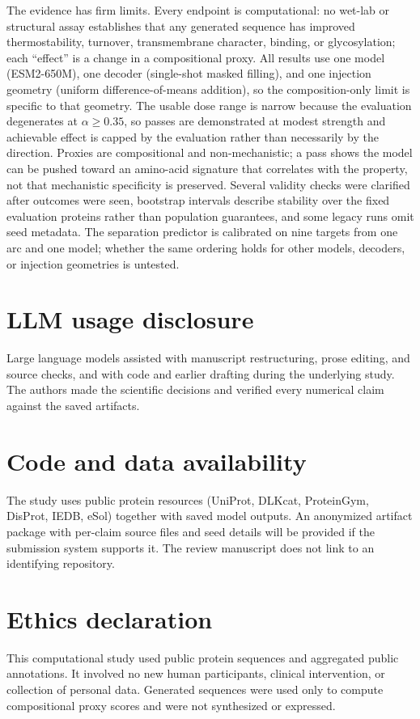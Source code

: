\documentclass{article}
\begin{document}
The evidence has firm limits. Every endpoint is computational: no wet-lab or
structural assay establishes that any generated sequence has improved
thermostability, turnover, transmembrane character, binding, or glycosylation;
each ``effect'' is a change in a compositional proxy. All results use one model
(ESM2-650M), one decoder (single-shot masked filling), and one injection
geometry (uniform difference-of-means addition), so the composition-only limit
is specific to that geometry. The usable dose range is narrow because the
evaluation degenerates at $\alpha\!\ge\!0.35$, so passes are demonstrated at
modest strength and achievable effect is capped by the evaluation rather than
necessarily by the direction. Proxies are compositional and non-mechanistic; a
pass shows the model can be pushed toward an amino-acid signature that
correlates with the property, not that mechanistic specificity is preserved.
Several validity checks were clarified after outcomes were seen, bootstrap
intervals describe stability over the fixed evaluation proteins rather than
population guarantees, and some legacy runs omit seed metadata. The separation
predictor is calibrated on nine targets from one arc and one model; whether the
same ordering holds for other models, decoders, or injection geometries is
untested.

\section*{LLM usage disclosure}
Large language models assisted with manuscript restructuring, prose editing, and
source checks, and with code and earlier drafting during the underlying study.
The authors made the scientific decisions and verified every numerical claim
against the saved artifacts.

\section*{Code and data availability}
The study uses public protein resources (UniProt, DLKcat, ProteinGym, DisProt,
IEDB, eSol) together with saved model outputs. An anonymized artifact package
with per-claim source files and seed details will be provided if the submission
system supports it. The review manuscript does not link to an identifying
repository.

\section*{Ethics declaration}
This computational study used public protein sequences and aggregated public
annotations. It involved no new human participants, clinical intervention, or
collection of personal data. Generated sequences were used only to compute
compositional proxy scores and were not synthesized or expressed.
\end{document}
